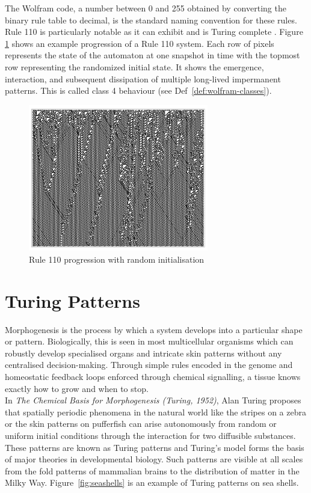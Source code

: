 The Wolfram code, a number between 0 and 255 obtained by converting the binary rule table to decimal, is the standard naming convention for these rules. Rule 110 is particularly notable as it can exhibit  and is Turing complete \cite{cook2004universality}. Figure \ref{fig:rule-110} shows an example progression of a Rule 110 system. Each row of pixels represents the state of the automaton at one snapshot in time with the topmost row representing the randomized initial state. It shows the emergence, interaction, and subsequent dissipation of multiple long-lived impermanent patterns. This is called class 4 behaviour\cite{wolfram2002} (see Def~\ref{def:wolfram-classes}).

\begin{figure}[!h]
\centering
\includegraphics[width=0.7\textwidth]{images/rule-110.png}
\caption{Rule 110 progression with random initialisation \cite{wolfram2002}}
\label{fig:rule-110}
\end{figure}

\section{Turing Patterns}
Morphogenesis is the process by which a system develops into a particular shape or pattern.  Biologically, this is seen in most multicellular organisms which can robustly develop specialised organs and intricate skin patterns without any centralised decision-making. Through simple rules encoded in the genome and homeostatic feedback loops enforced through chemical signalling, a tissue knows exactly how to grow and when to stop.\\

In \textit{The Chemical Basis for Morphogenesis (Turing, 1952)}\cite{turing1990chemical}, Alan Turing proposes that spatially periodic phenomena in the natural world like the stripes on a zebra or the skin patterns on pufferfish can arise autonomously from random or uniform initial conditions through the interaction for two diffusible substances. These patterns are known as Turing patterns and Turing's model forms the basis of major theories in developmental biology. Such patterns are visible at all scales from the fold patterns of mammalian brains\cite{cartwright2002labyrinthine} to the distribution of matter in the Milky Way\cite{smolin1996galactic}. Figure~\ref{fig:seashells} is an example of Turing patterns on sea shells.

